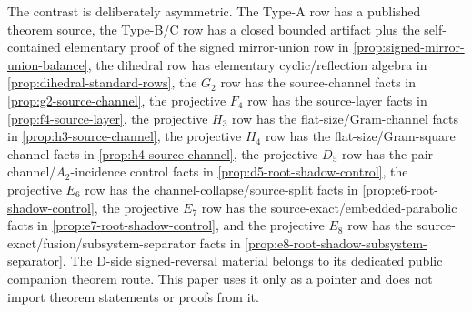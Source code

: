The contrast is deliberately asymmetric.  The Type-A row has a published theorem source, the Type-B/C row has a closed bounded artifact plus the self-contained elementary proof of the signed mirror-union row in \cref{prop:signed-mirror-union-balance}, the dihedral row has elementary cyclic/reflection algebra in \cref{prop:dihedral-standard-rows}, the \(G_2\) row has the source-channel facts in \cref{prop:g2-source-channel}, the projective \(F_4\) row has the source-layer facts in \cref{prop:f4-source-layer}, the projective \(H_3\) row has the flat-size/Gram-channel facts in \cref{prop:h3-source-channel}, the projective \(H_4\) row has the flat-size/Gram-square channel facts in \cref{prop:h4-source-channel}, the projective \(D_5\) row has the pair-channel/\(A_2\)-incidence control facts in \cref{prop:d5-root-shadow-control}, the projective \(E_6\) row has the channel-collapse/source-split facts in \cref{prop:e6-root-shadow-control}, the projective \(E_7\) row has the source-exact/embedded-parabolic facts in \cref{prop:e7-root-shadow-control}, and the projective \(E_8\) row has the source-exact/fusion/subsystem-separator facts in \cref{prop:e8-root-shadow-subsystem-separator}.  The D-side signed-reversal material belongs to its dedicated public companion theorem route\cite{BabanskyySignedReversal2026}.  This paper uses it only as a pointer and does not import theorem statements or proofs from it.

